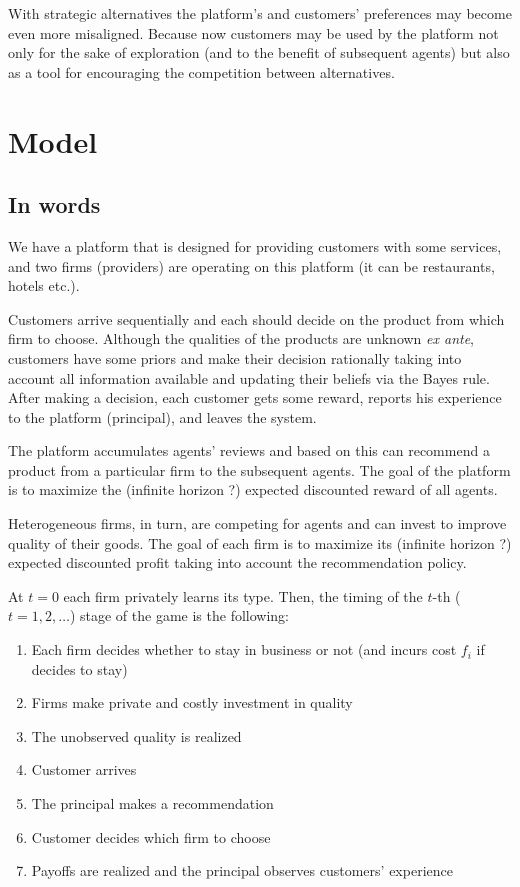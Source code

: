 \documentclass[a4paper]{article}
\begin{document}
	
	
	
	With strategic alternatives the platform's and customers' preferences may become even more misaligned. Because now customers may be used by the platform not only for the sake of exploration (and to the benefit of subsequent agents) but also as a tool for encouraging the competition between alternatives.
	
	\section{Model}
	\subsection{In words}
	We have a platform that is designed for providing customers with some services, and two firms (providers) are operating on this platform (it can be restaurants, hotels etc.).
	
	
	
	
	 Customers arrive sequentially and each should decide on the product from which firm to choose. Although the qualities of the products are unknown \textit{ex ante}, customers have some priors and make their decision rationally taking into account all information available and updating their beliefs via the Bayes rule. After making a decision, each customer gets some reward, reports his experience to the platform (principal), and leaves the system. 
	
	
	
	
	The platform accumulates agents' reviews and based on this can recommend a product from a particular firm to the subsequent agents. The goal of the platform is to maximize the (infinite horizon ?) expected discounted reward of all agents. 
	
	
	
	Heterogeneous firms, in turn, are competing for agents and can invest to improve quality of their goods. The goal of each firm is to maximize its (infinite horizon ?) expected discounted profit taking into account the recommendation policy.
	
	
	At $t = 0$ each firm privately learns its type. Then, the timing of the $t$-th ($t=1, 2, \dots$) stage of the game is the following:
	\begin{enumerate}[1)]
		\item Each firm decides whether to stay in business or not (and incurs cost $f_i$ if decides to stay)
		\item Firms make private and costly investment in quality
		\item The unobserved quality is realized
		\item Customer arrives
		\item The principal makes a recommendation
		\item Customer decides which firm to choose
		\item Payoffs are realized and the principal observes customers' experience
	\end{enumerate}
\end{document}

